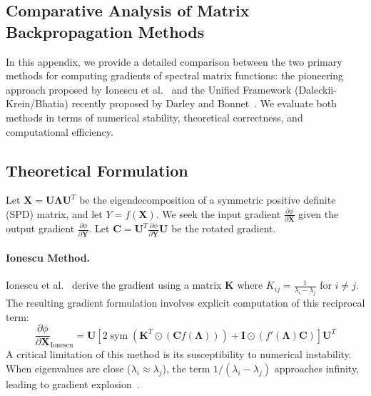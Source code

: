 \documentclass{article}
\begin{document}
\appendixpage

\begin{appendices}

  \section{Comparative Analysis of Matrix Backpropagation Methods}
  \label{sec:appendix_matrix_bp}

  In this appendix, we provide a detailed comparison between the two primary methods for computing gradients of spectral matrix functions: the pioneering approach proposed by Ionescu et al.~\cite{ionescu2015matrix} and the Unified Framework (Daleckii-Krein/Bhatia) recently proposed by Darley and Bonnet~\cite{darley2024unified}. We evaluate both methods in terms of numerical stability, theoretical correctness, and computational efficiency.

  \subsection{Theoretical Formulation}

  Let $\mathbf{X} = \mathbf{U}\mathbf{\Lambda}\mathbf{U}^T$ be the eigendecomposition of a symmetric positive definite (SPD) matrix, and let $Y = f(\mathbf{X})$. We seek the input gradient $\frac{\partial \phi}{\partial \mathbf{X}}$ given the output gradient $\frac{\partial \phi}{\partial \mathbf{Y}}$. Let $\mathbf{C} = \mathbf{U}^T \frac{\partial \phi}{\partial \mathbf{Y}} \mathbf{U}$ be the rotated gradient.

  \paragraph{Ionescu Method.}
  Ionescu et al.~\cite{ionescu2015matrix} derive the gradient using a matrix $\mathbf{K}$ where $K_{ij} = \frac{1}{\lambda_i - \lambda_j}$ for $i \neq j$. The resulting gradient formulation involves explicit computation of this reciprocal term:
  \begin{equation}
    \frac{\partial \phi}{\partial \mathbf{X}}_{\text{Ionescu}} = \mathbf{U} \left[ 2 \operatorname{sym}(\mathbf{K}^T \odot (\mathbf{C} f(\mathbf{\Lambda}))) + \mathbf{I} \odot (f'(\mathbf{\Lambda}) \mathbf{C}) \right] \mathbf{U}^T
  \end{equation}
  A critical limitation of this method is its susceptibility to numerical instability. When eigenvalues are close ($\lambda_i \approx \lambda_j$), the term $1/(\lambda_i - \lambda_j)$ approaches infinity, leading to gradient explosion~\cite{darley2024unified}.


\end{appendices}
\end{document}
